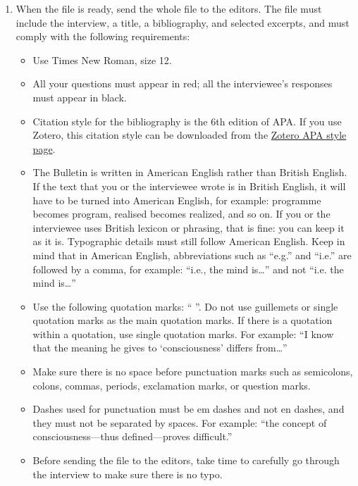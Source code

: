 \documentclass[11pt]{article}
\begin{document}
\begin{enumerate}
\begin{itemize}[label=\textendash,leftmargin=1.5em]
  \item Select two to six excerpts, depending on the length of the interview, highlighting key points made by the interviewee and nicely epitomizing their ideas. These passages must be no longer than one or two sentences. Insert the selected excerpts at the very end of the text.
  \end{itemize}
\item When the file is ready, send the whole file to the editors. The file must include the interview, a title, a bibliography, and selected excerpts, and must comply with the following requirements:
  \begin{itemize}[label=\textendash,leftmargin=1.5em]
  \item Use Times New Roman, size 12.
  \item All your questions must appear in red; all the interviewee's responses must appear in black.
  \item Citation style for the bibliography is the 6th edition of APA. If you use Zotero, this citation style can be downloaded from the \href{https://www.zotero.org/styles?q=id%3Aapa}{Zotero APA style page}.
  \item The Bulletin is written in American English rather than British English. If the text that you or the interviewee wrote is in British English, it will have to be turned into American English, for example: programme becomes program, realised becomes realized, and so on. If you or the interviewee uses British lexicon or phrasing, that is fine: you can keep it as it is. Typographic details must still follow American English. Keep in mind that in American English, abbreviations such as ``e.g.'' and ``i.e.'' are followed by a comma, for example: ``i.e., the mind is\ldots'' and not ``i.e. the mind is\ldots''
  \item Use the following quotation marks: `` ''. Do not use guillemets or single quotation marks as the main quotation marks. If there is a quotation within a quotation, use single quotation marks. For example: ``I know that the meaning he gives to `consciousness' differs from\ldots''
  \item Make sure there is no space before punctuation marks such as semicolons, colons, commas, periods, exclamation marks, or question marks.
  \item Dashes used for punctuation must be em dashes and not en dashes, and they must not be separated by spaces. For example: ``the concept of consciousness---thus defined---proves difficult.''
  \item Before sending the file to the editors, take time to carefully go through the interview to make sure there is no typo.

\end{itemize}
\end{enumerate}
\end{document}
